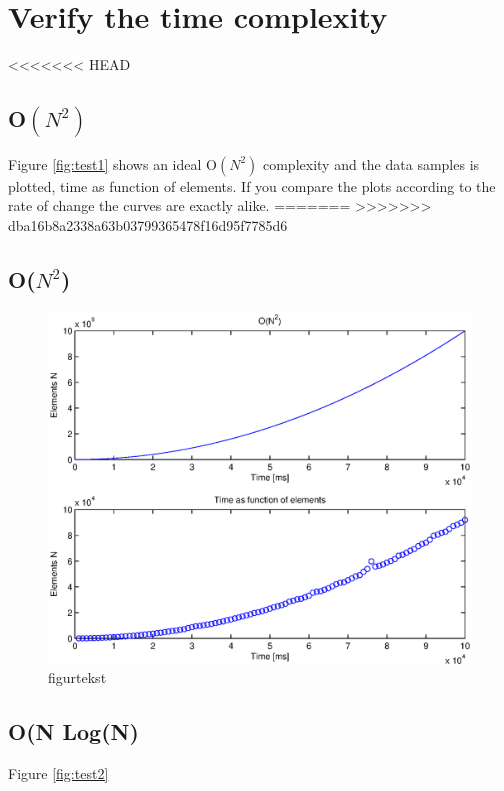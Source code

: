 \section{Verify the time complexity}

<<<<<<< HEAD

\subsection{O\(\left( { N }^{ 2 } \right)\)}
Figure \ref{fig:test1} shows an ideal O\(\left( { N }^{ 2 } \right)\) complexity and the data samples is plotted, time as function of elements. If you compare the plots according to the rate of change the curves are exactly alike. 
=======
>>>>>>> dba16b8a2338a63b03799365478f16d95f7785d6



\subsection{O(\(N^{2}\))}



\begin{figure}[th!]
\centering
\includegraphics[width=1\textwidth]{./graphics/test1.eps}
\caption[tekst i indholdsfortegnelsen]{figurtekst}
\label{fig:}
\end{figure}
\newpage


\subsection{O(N Log(N)}
Figure \ref{fig:test2}


